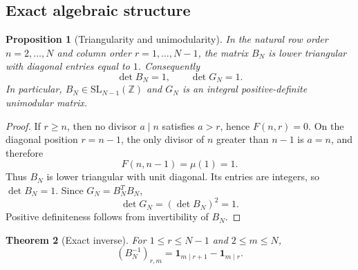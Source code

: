 \documentclass[11pt]{amsart}
\numberwithin{equation}{section}
\theoremstyle{plain}
\newtheorem{theorem}{Theorem}[section]
\newtheorem{proposition}[theorem]{Proposition}
\theoremstyle{definition}
\theoremstyle{remark}
\newcommand{\mob}{\mu}
\begin{document}
\subsection{Exact algebraic structure}
\label{subsec:exact_structure}

\begin{proposition}[Triangularity and unimodularity]
\label{prop:triangular_unimodular}
In the natural row order $n=2,\ldots,N$ and column order $r=1,\ldots,N-1$, the matrix $B_N$ is lower triangular with diagonal entries equal to $1$.  Consequently
\begin{equation}
\det B_N=1,
\qquad
\det G_N=1.
\label{eq:determinants_one}
\end{equation}
In particular, $B_N\in \mathrm{SL}_{N-1}(\mathbb Z)$ and $G_N$ is an integral positive-definite unimodular matrix.
\end{proposition}

\begin{proof}
If $r\ge n$, then no divisor $a\mid n$ satisfies $a>r$, hence $F(n,r)=0$.  On the diagonal position $r=n-1$, the only divisor of $n$ greater than $n-1$ is $a=n$, and therefore
\begin{equation}
F(n,n-1)=\mob(1)=1.
\end{equation}
Thus $B_N$ is lower triangular with unit diagonal.  Its entries are integers, so $\det B_N=1$.  Since $G_N=B_N^TB_N$,
\begin{equation}
\det G_N=(\det B_N)^2=1.
\end{equation}
Positive definiteness follows from invertibility of $B_N$.
\end{proof}

\begin{theorem}[Exact inverse]
\label{thm:BN_inverse}
For $1\le r\le N-1$ and $2\le m\le N$,
\begin{equation}
(B_N^{-1})_{r,m}
=
\mathbf 1_{m\mid r+1}-\mathbf 1_{m\mid r}.
\label{eq:BN_inverse}
\end{equation}
\end{theorem}
\end{document}
